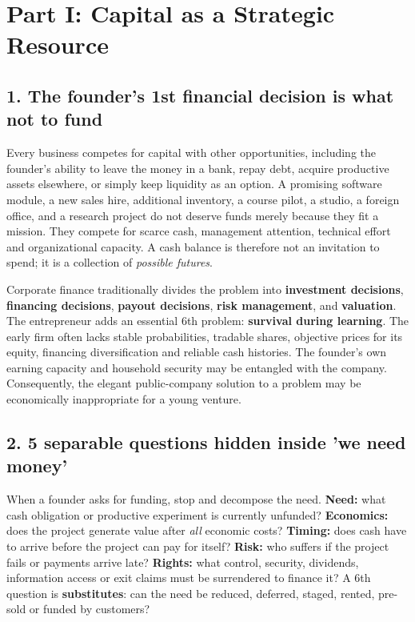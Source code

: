 \section{Part I: Capital as a Strategic Resource}

\subsection{1. The founder's 1st financial decision is what not to fund}


Every business competes for capital with other opportunities, including the founder's ability to leave the money in a bank, repay debt, acquire productive assets elsewhere, or simply keep liquidity as an option. A promising software module, a new sales hire, additional inventory, a course pilot, a studio, a foreign office, and a research project do not deserve funds merely because they fit a mission. They compete for scarce cash, management attention, technical effort and organizational capacity. A cash balance is therefore not an invitation to spend; it is a collection of \textit{possible futures}.

Corporate finance traditionally divides the problem into \textbf{investment decisions}, \textbf{financing decisions}, \textbf{payout decisions}, \textbf{risk management}, and \textbf{valuation}. The entrepreneur adds an essential 6th problem: \textbf{survival during learning}. The early firm often lacks stable probabilities, tradable shares, objective prices for its equity, financing diversification and reliable cash histories. The founder's own earning capacity and household security may be entangled with the company. Consequently, the elegant public-company solution to a problem may be economically inappropriate for a young venture.

\subsection{2. 5 separable questions hidden inside 'we need money'}


When a founder asks for funding, stop and decompose the need. \textbf{Need:} what cash obligation or productive experiment is currently unfunded? \textbf{Economics:} does the project generate value after \textit{all} economic costs? \textbf{Timing:} does cash have to arrive before the project can pay for itself? \textbf{Risk:} who suffers if the project fails or payments arrive late? \textbf{Rights:} what control, security, dividends, information access or exit claims must be surrendered to finance it? A 6th question is \textbf{substitutes}: can the need be reduced, deferred, staged, rented, pre-sold or funded by customers?

